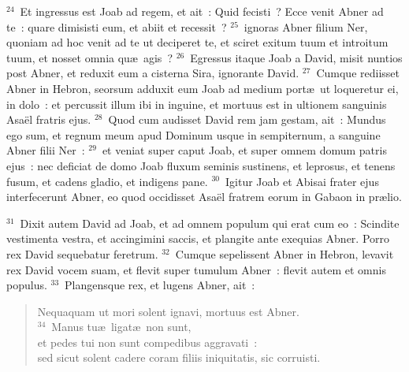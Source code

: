 ${}^{24}$~Et ingressus est Joab ad regem, et ait~: Quid fecisti~? Ecce venit Abner ad te~: quare dimisisti eum, et abiit et recessit~?
${}^{25}$~ignoras Abner filium Ner, quoniam ad hoc venit ad te ut deciperet te, et sciret exitum tuum et introitum tuum, et nosset omnia qu\ae\ agis~?
${}^{26}$~Egressus itaque Joab a David, misit nuntios post Abner, et reduxit eum a cisterna Sira, ignorante David.
${}^{27}$~Cumque rediisset Abner in Hebron, seorsum adduxit eum Joab ad medium port\ae\ ut loqueretur ei, in dolo~: et percussit illum ibi in inguine, et mortuus est in ultionem sanguinis Asa\"el fratris ejus.
${}^{28}$~Quod cum audisset David rem jam gestam, ait~: Mundus ego sum, et regnum meum apud Dominum usque in sempiternum, a sanguine Abner filii Ner~:
${}^{29}$~et veniat super caput Joab, et super omnem domum patris ejus~: nec deficiat de domo Joab fluxum seminis sustinens, et leprosus, et tenens fusum, et cadens gladio, et indigens pane.
${}^{30}$~Igitur Joab et Abisai frater ejus interfecerunt Abner, eo quod occidisset Asa\"el fratrem eorum in Gabaon in pr\ae lio.


${}^{31}$~Dixit autem David ad Joab, et ad omnem populum qui erat cum eo~: Scindite vestimenta vestra, et accingimini saccis, et plangite ante exequias Abner. Porro rex David sequebatur feretrum.
${}^{32}$~Cumque sepelissent Abner in Hebron, levavit rex David vocem suam, et flevit super tumulum Abner~: flevit autem et omnis populus.
${}^{33}$~Plangensque rex, et lugens Abner, ait~: \begin{flushleft}\begin{verse}Nequaquam ut mori solent ignavi, mortuus est Abner.\\
${}^{34}$~Manus tu\ae\ ligat\ae\ non sunt,\\ et pedes tui non sunt compedibus aggravati~:\\ sed sicut solent cadere coram filiis iniquitatis, sic corruisti.\end{verse}\end{flushleft}

